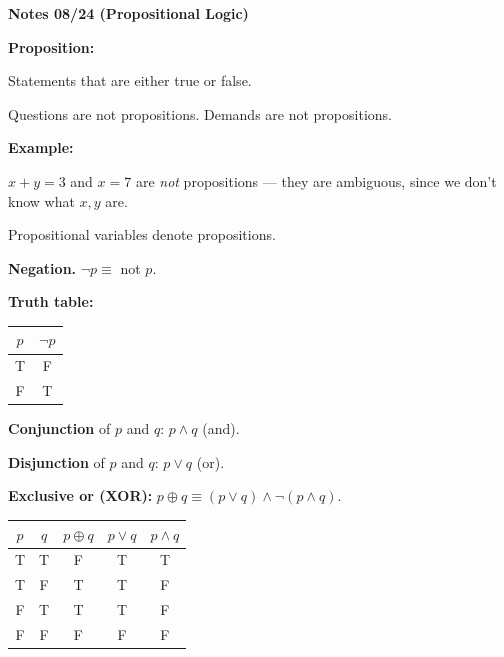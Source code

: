 \documentclass{article}
\begin{document}
\textbf{Notes 08/24 (Propositional Logic)}

\bigskip

\textbf{Proposition:}

\medskip

Statements that are either true or false.

\medskip

Questions are not propositions. Demands are not propositions.

\bigskip

\textbf{Example:}

\medskip

$x + y = 3$ and $x = 7$ are \emph{not} propositions --- they are ambiguous, since we don't know what $x, y$ are.

\medskip

Propositional variables denote propositions.

\bigskip

\textbf{Negation.} $\lnot p \equiv$ not $p$.

\medskip

\textbf{Truth table:}
\begin{center}
\begin{tabular}{c|c}
$p$ & $\lnot p$ \\
\hline
T & F \\
F & T
\end{tabular}
\end{center}

\bigskip

\textbf{Conjunction} of $p$ and $q$: $p \land q$ (and).

\smallskip

\textbf{Disjunction} of $p$ and $q$: $p \lor q$ (or).

\smallskip

\textbf{Exclusive or (XOR):} $p \oplus q \equiv (p \lor q) \land \lnot (p \land q)$.

\medskip

\begin{center}
\begin{tabular}{ccccc}
$p$ & $q$ & $p \oplus q$ & $p \lor q$ & $p \land q$ \\
\hline
T & T & F & T & T \\
T & F & T & T & F \\
F & T & T & T & F \\
F & F & F & F & F
\end{tabular}
\end{center}
\end{document}
